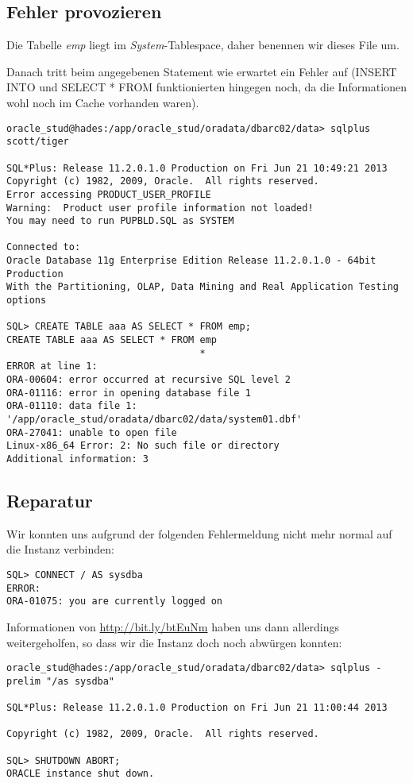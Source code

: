 \documentclass[11pt,a4paper,parskip=half]{scrartcl}
\begin{document}
\subsection{Fehler provozieren}
Die Tabelle \emph{emp} liegt im \emph{System}-Tablespace, daher benennen wir dieses File um.

Danach tritt beim angegebenen Statement wie erwartet ein Fehler auf (INSERT INTO und SELECT * FROM funktionierten hingegen noch, da die Informationen wohl noch im Cache vorhanden waren).
\begin{lstlisting}
oracle_stud@hades:/app/oracle_stud/oradata/dbarc02/data> sqlplus scott/tiger

SQL*Plus: Release 11.2.0.1.0 Production on Fri Jun 21 10:49:21 2013
Copyright (c) 1982, 2009, Oracle.  All rights reserved.
Error accessing PRODUCT_USER_PROFILE
Warning:  Product user profile information not loaded!
You may need to run PUPBLD.SQL as SYSTEM

Connected to:
Oracle Database 11g Enterprise Edition Release 11.2.0.1.0 - 64bit Production
With the Partitioning, OLAP, Data Mining and Real Application Testing options

SQL> CREATE TABLE aaa AS SELECT * FROM emp;
CREATE TABLE aaa AS SELECT * FROM emp
                                  *
ERROR at line 1:
ORA-00604: error occurred at recursive SQL level 2
ORA-01116: error in opening database file 1
ORA-01110: data file 1: '/app/oracle_stud/oradata/dbarc02/data/system01.dbf'
ORA-27041: unable to open file
Linux-x86_64 Error: 2: No such file or directory
Additional information: 3
\end{lstlisting}

\subsection{Reparatur}
Wir konnten uns aufgrund der folgenden Fehlermeldung nicht mehr normal auf die Instanz verbinden:
\begin{lstlisting}
SQL> CONNECT / AS sysdba
ERROR:
ORA-01075: you are currently logged on
\end{lstlisting}

Informationen von \url{http://bit.ly/btEuNm} haben uns dann allerdings weitergeholfen, so dass wir die Instanz doch noch \glqq{}abwürgen\grqq{} konnten:
\begin{lstlisting}
oracle_stud@hades:/app/oracle_stud/oradata/dbarc02/data> sqlplus -prelim "/as sysdba"

SQL*Plus: Release 11.2.0.1.0 Production on Fri Jun 21 11:00:44 2013

Copyright (c) 1982, 2009, Oracle.  All rights reserved.

SQL> SHUTDOWN ABORT;
ORACLE instance shut down.
\end{lstlisting}
\end{document}

